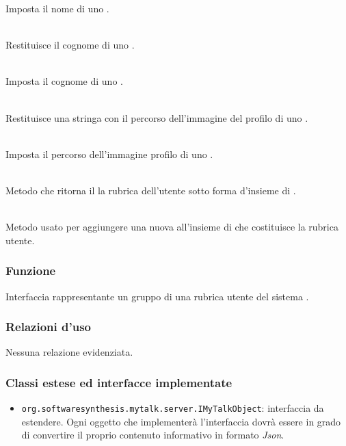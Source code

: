 \begin{description}
	Imposta il nome di uno .
	\item{}\\
	Restituisce il cognome di uno .
	\item{}\\
	Imposta il cognome di uno .
	\item{}\\
	Restituisce una stringa con il percorso dell'immagine del profilo di uno .
	\item{}\\
	Imposta il percorso dell'immagine profilo di uno .
	\item{}\\
	Metodo che ritorna il la rubrica dell'utente sotto forma d'insieme di .
	\item{}\\
	Metodo usato per aggiungere una nuova  all'insieme di  che costituisce la rubrica utente.
\end{description}


\subsubsection*{Funzione}
Interfaccia rappresentante un gruppo di una rubrica utente del sistema \caName.

\subsubsection*{Relazioni d'uso}

Nessuna relazione evidenziata.

\subsubsection*{Classi estese ed interfacce implementate}
\begin{itemize}
		\item \texttt{org.softwaresynthesis.mytalk.server.IMyTalkObject}: interfaccia da estendere. Ogni oggetto che implementerà l'interfaccia  dovrà essere in grado di convertire il proprio contenuto informativo in formato \textit{Json}.
\end{itemize}

